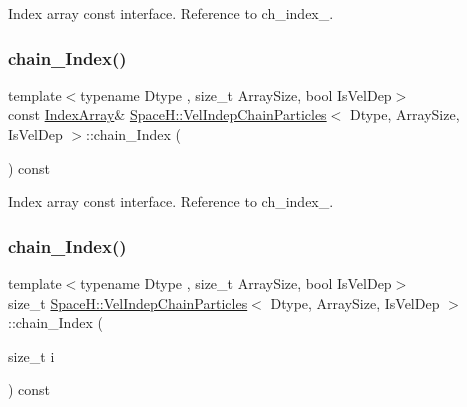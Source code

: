 Index array const interface. Reference to ch\+\_\+index\+\_\+. 

\mbox{\label{class_space_h_1_1_vel_indep_chain_particles_a4136b399758a4547ce22024318d9b654}} 
\subsubsection{\texorpdfstring{chain_\+Index()}{chainIndex()}\hspace{0.1cm}{\footnotesize\ttfamily [2/4]}}
{\footnotesize\ttfamily template$<$typename Dtype , size\+\_\+t Array\+Size, bool Is\+Vel\+Dep$>$ \\
const \mbox{\hyperlink{class_space_h_1_1_vel_indep_chain_particles_a48b9183f8d68fe8af42bf405125d450c}{Index\+Array}}\& \mbox{\hyperlink{class_space_h_1_1_vel_indep_chain_particles}{Space\+H\+::\+Vel\+Indep\+Chain\+Particles}}$<$ Dtype, Array\+Size, Is\+Vel\+Dep $>$\+::chain_\+Index (\begin{DoxyParamCaption}{ }\end{DoxyParamCaption}) const\hspace{0.3cm}{\ttfamily [inline]}}



Index array const interface. Reference to ch\+\_\+index\+\_\+. 

\mbox{\label{class_space_h_1_1_vel_indep_chain_particles_ae66137f6ce2394142db438fd010ae17c}} 
\subsubsection{\texorpdfstring{chain_\+Index()}{chainIndex()}\hspace{0.1cm}{\footnotesize\ttfamily [3/4]}}
{\footnotesize\ttfamily template$<$typename Dtype , size\+\_\+t Array\+Size, bool Is\+Vel\+Dep$>$ \\
size\+\_\+t \mbox{\hyperlink{class_space_h_1_1_vel_indep_chain_particles}{Space\+H\+::\+Vel\+Indep\+Chain\+Particles}}$<$ Dtype, Array\+Size, Is\+Vel\+Dep $>$\+::chain_\+Index (\begin{DoxyParamCaption}\item[{size\+\_\+t}]{i }\end{DoxyParamCaption}) const\hspace{0.3cm}{\ttfamily [inline]}}




